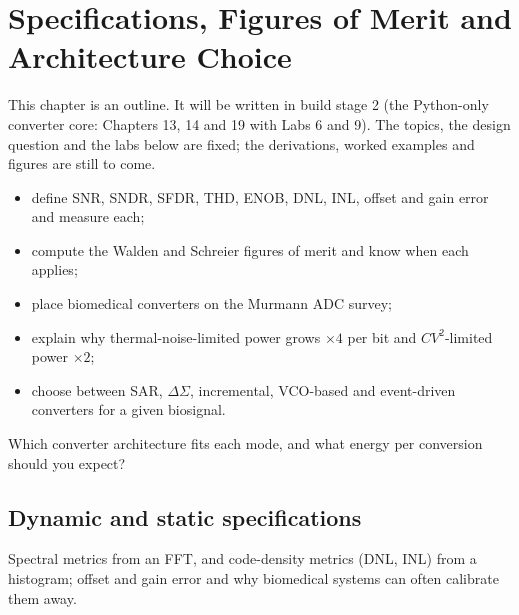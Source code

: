 \chapter{Specifications, Figures of Merit and Architecture Choice}\label{ch:adcspecs}

\begin{specnote}
This chapter is an outline. It will be written in build stage 2 (the Python-only converter core: Chapters 13, 14 and 19 with Labs 6 and 9). The topics, the design question and the labs below are fixed; the derivations, worked examples and figures are still to come.
\end{specnote}

\begin{objectives}
\begin{itemize}
  \item define SNR, SNDR, SFDR, THD, ENOB, DNL, INL, offset and gain error and measure each;
  \item compute the Walden and Schreier figures of merit and know when each applies;
  \item place biomedical converters on the Murmann ADC survey;
  \item explain why thermal-noise-limited power grows $\times 4$ per bit and $CV^2$-limited power $\times 2$;
  \item choose between SAR, $\Delta\Sigma$, incremental, VCO-based and event-driven converters for a given biosignal.
\end{itemize}
\end{objectives}

\begin{insight}
Which converter architecture fits each \OB{} mode, and what energy per conversion should you expect?
\end{insight}

\section{Dynamic and static specifications}\label{sec:ch14-1}
Spectral metrics from an FFT, and code-density metrics (DNL, INL) from a histogram; offset and gain error and why biomedical systems can often calibrate them away.

